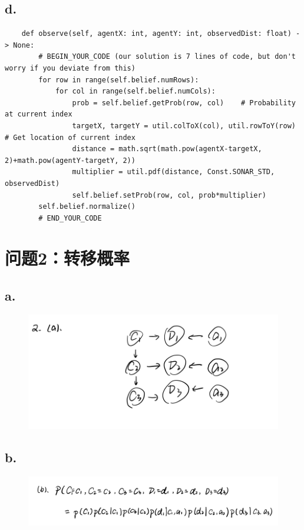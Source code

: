 \documentclass{article}
\begin{document}
\subsection*{d.}
\begin{lstlisting}
    def observe(self, agentX: int, agentY: int, observedDist: float) -> None:
        # BEGIN_YOUR_CODE (our solution is 7 lines of code, but don't worry if you deviate from this)
        for row in range(self.belief.numRows):
            for col in range(self.belief.numCols):
                prob = self.belief.getProb(row, col)    # Probability at current index
                targetX, targetY = util.colToX(col), util.rowToY(row)   # Get location of current index
                distance = math.sqrt(math.pow(agentX-targetX, 2)+math.pow(agentY-targetY, 2))
                multiplier = util.pdf(distance, Const.SONAR_STD, observedDist)
                self.belief.setProb(row, col, prob*multiplier)
        self.belief.normalize()
        # END_YOUR_CODE
\end{lstlisting}

\section*{问题2：转移概率}
\subsection*{a.}
\begin{figure}[H]
    \centering
    \includegraphics[scale=0.5]{2a.png}
\end{figure}
\subsection*{b.}
\begin{figure}[H]
    \centering
    \includegraphics[scale=0.5]{2b.png}
\end{figure}
\end{document}
